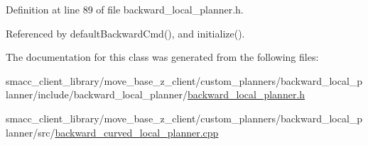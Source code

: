Definition at line 89 of file backward\+\_\+local\+\_\+planner.\+h.



Referenced by default\+Backward\+Cmd(), and initialize().



The documentation for this class was generated from the following files\+:\begin{DoxyCompactItemize}
\item 
smacc\+\_\+client\+\_\+library/move\+\_\+base\+\_\+z\+\_\+client/custom\+\_\+planners/backward\+\_\+local\+\_\+planner/include/backward\+\_\+local\+\_\+planner/\hyperlink{backward__local__planner_8h}{backward\+\_\+local\+\_\+planner.\+h}\item 
smacc\+\_\+client\+\_\+library/move\+\_\+base\+\_\+z\+\_\+client/custom\+\_\+planners/backward\+\_\+local\+\_\+planner/src/\hyperlink{backward__curved__local__planner_8cpp}{backward\+\_\+curved\+\_\+local\+\_\+planner.\+cpp}\end{DoxyCompactItemize}
